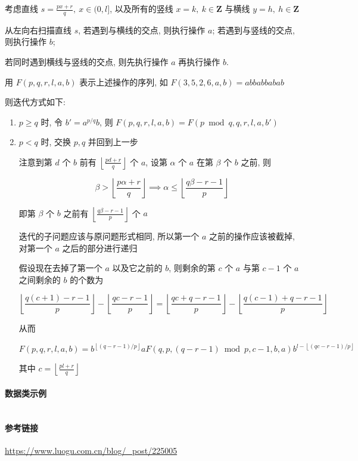 考虑直线 \(s=\frac{px+r}{q},~x\in (0,l]\), 以及所有的竖线 \(x=k,~k\in\mathbf{Z}\) 与横线 \(y=h,~h\in\mathbf{Z}\)

从左向右扫描直线 \(s\), 若遇到与横线的交点, 则执行操作 \(a\); 若遇到与竖线的交点, 则执行操作 \(b\);

若同时遇到横线与竖线的交点, 则先执行操作 \(a\) 再执行操作 \(b\).

用 \(F(p,q,r,l,a,b)\) 表示上述操作的序列, 如 \(F(3,5,2,6,a,b)=abbabbabab\)

则迭代方式如下:

\begin{enumerate}
    \item \(p\geq q\) 时, 令 \(b'=a^{p/q}b\), 则 \(F(p,q,r,l,a,b)=F(p\bmod q,q,r,l,a,b')\)
    \item \(p<q\) 时, 交换 \(p,q\) 并回到上一步
          
          注意到第 \(d\) 个 \(b\) 前有 \(\left\lfloor\frac{pd+r}{q}\right\rfloor\) 个 \(a\), 设第 \(\alpha\) 个 \(a\) 在第 \(\beta\) 个 \(b\) 之前, 则
          
          \[
              \beta > \left\lfloor\frac{p\alpha+r}{q}\right\rfloor \implies \alpha \leq \left\lfloor\frac{q\beta-r-1}{p}\right\rfloor
          \]
          
          即第 \(\beta\) 个 \(b\) 之前有 \(\left\lfloor\frac{q\beta-r-1}{p}\right\rfloor\) 个 \(a\)
          
          迭代的子问题应该与原问题形式相同, 所以第一个 \(a\) 之前的操作应该被截掉, 对第一个 \(a\) 之后的部分进行递归
          
          假设现在去掉了第一个 \(a\) 以及它之前的 \(b\), 则剩余的第 \(c\) 个 \(a\) 与第 \(c-1\) 个 \(a\) 之间剩余的 \(b\) 的个数为
          
          \[
              \left\lfloor\frac{q(c+1)-r-1}{p}\right\rfloor-\left\lfloor\frac{qc-r-1}{p}\right\rfloor=\left\lfloor\frac{qc+q-r-1}{p}\right\rfloor-\left\lfloor\frac{q(c-1)+q-r-1}{p}\right\rfloor
          \]
          
          从而
          
          \[
              F(p,q,r,l,a,b)=b^{\left\lfloor (q-r-1)/p \right\rfloor}aF(q,p,(q-r-1)\bmod p,c-1,b,a)b^{l-\left\lfloor (qc-r-1)/p \right\rfloor}
          \]
          
          其中 \(c=\left\lfloor\frac{pl+r}{q}\right\rfloor\)
\end{enumerate}

\paragraph{数据类示例}

\inputminted{cpp}{src/src/exeuclid_node.cpp}

\paragraph{参考链接}

\url{https://www.luogu.com.cn/blog/_post/225005}
